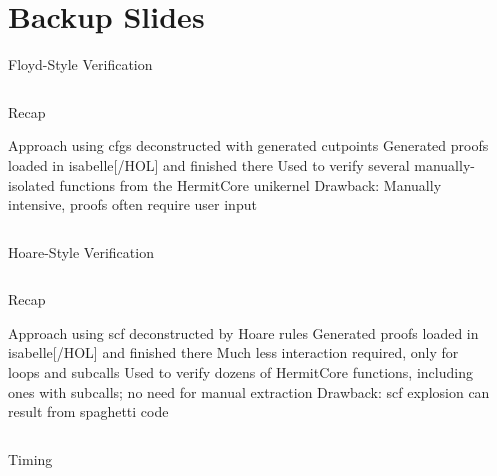 \section{Backup Slides}
\begin{frame}[label=floyd]{Floyd-Style Verification}
  \begin{columns}
    \begin{block}{Recap}
      \begin{outline}
        \1 Approach using \glspl{cfg} deconstructed with generated \alert{cutpoints}
        \1 Generated proofs loaded in \gls{isabelle}[/HOL] and finished there
        \1 Used to verify several manually-isolated functions from \alert{the HermitCore unikernel}
        \1 Drawback: Manually intensive, proofs often require user input
      \end{outline}
    \end{block}

    \begin{example}
    \end{example}
  \end{columns}
\end{frame}

\begin{frame}[label=hoare]{Hoare-Style Verification}
  \begin{columns}
    \begin{block}{Recap}
      \begin{outline}
        \1 Approach using \gls{scf} deconstructed by \alert{Hoare rules}
        \1 Generated proofs loaded in \gls{isabelle}[/HOL] and finished there
        \2 Much less interaction required, only for loops and subcalls
        \1 Used to verify dozens of HermitCore functions, including ones with subcalls; no need for manual extraction
        \1 Drawback: \gls{scf} explosion can result from spaghetti code
      \end{outline}
    \end{block}

    \begin{example}
    \end{example}
  \end{columns}
\end{frame}

\begin{frame}[label=timing]{ Timing}
  \centering
\end{frame}

